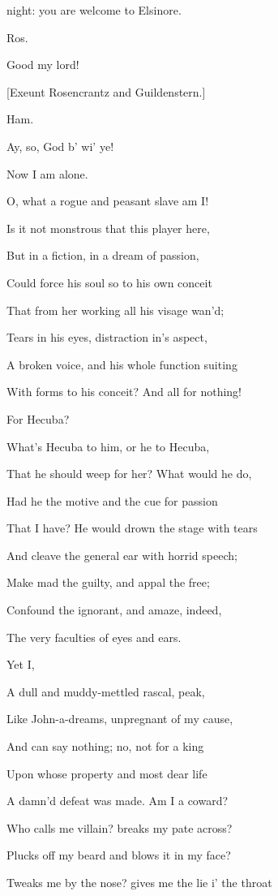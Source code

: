 \documentclass[12pt]{book}
\begin{document}
night: you are welcome to Elsinore.



Ros.

Good my lord!



[Exeunt Rosencrantz and Guildenstern.]



Ham.

Ay, so, God b' wi' ye!

Now I am alone.

O, what a rogue and peasant slave am I!

Is it not monstrous that this player here,

But in a fiction, in a dream of passion,

Could force his soul so to his own conceit

That from her working all his visage wan'd;

Tears in his eyes, distraction in's aspect,

A broken voice, and his whole function suiting

With forms to his conceit? And all for nothing!

For Hecuba?

What's Hecuba to him, or he to Hecuba,

That he should weep for her? What would he do,

Had he the motive and the cue for passion

That I have? He would drown the stage with tears

And cleave the general ear with horrid speech;

Make mad the guilty, and appal the free;

Confound the ignorant, and amaze, indeed,

The very faculties of eyes and ears.

Yet I,

A dull and muddy-mettled rascal, peak,

Like John-a-dreams, unpregnant of my cause,

And can say nothing; no, not for a king

Upon whose property and most dear life

A damn'd defeat was made. Am I a coward?

Who calls me villain? breaks my pate across?

Plucks off my beard and blows it in my face?

Tweaks me by the nose? gives me the lie i' the throat
\end{document}
